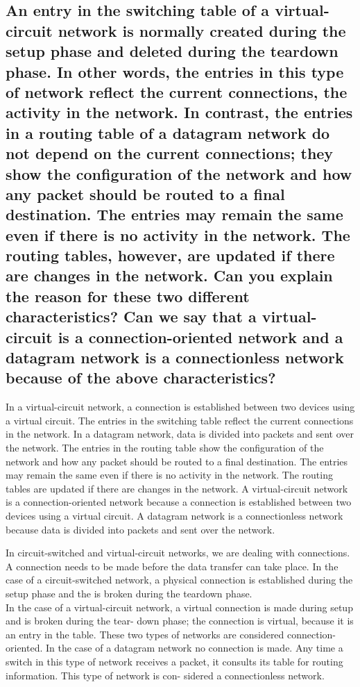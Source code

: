 \documentclass{article}
\begin{document}
\subsection{An entry in the switching table of a virtual-circuit network is normally created
	during the setup phase and deleted during the teardown phase. In other words,
	the entries in this type of network reflect the current connections, the activity
	in the network. In contrast, the entries in a routing table of a datagram network
	do not depend on the current connections; they show the configuration of the
	network and how any packet should be routed to a final destination. The
	entries may remain the same even if there is no activity in the network. The
	routing tables, however, are updated if there are changes in the network. Can
	you explain the reason for these two different characteristics?
	Can we say that a virtual-circuit is a connection-oriented network and a datagram network is a
	connectionless network because of the above characteristics?}

In a virtual-circuit network, a connection is established between two devices using a virtual circuit.
The entries in the switching table reflect the current connections in the network. In a datagram network, data is divided into packets and sent over the network.
The entries in the routing table show the configuration of the network and how any packet should be routed to a final destination.
The entries may remain the same even if there is no activity in the network.
The routing tables are updated if there are changes in the network.
A virtual-circuit network is a connection-oriented network because a connection is established between two devices using a virtual circuit.
A datagram network is a connectionless network because data is divided into packets and sent over the network.

\begin{proposition}
	In circuit-switched and virtual-circuit networks, we are dealing with connections.
	A connection needs to be made before the data transfer can take place. In the case
	of a circuit-switched network, a physical connection is established during the setup
	phase and the is broken during the teardown phase. \\ In the case of a virtual-circuit
	network, a virtual connection is made during setup and is broken during the tear-
	down phase; the connection is virtual, because it is an entry in the table. These two
	types of networks are considered connection-oriented. In the case of a datagram
	network no connection is made. Any time a switch in this type of network receives
	a packet, it consults its table for routing information. This type of network is con-
	sidered a connectionless network.
\end{proposition}
\end{document}
